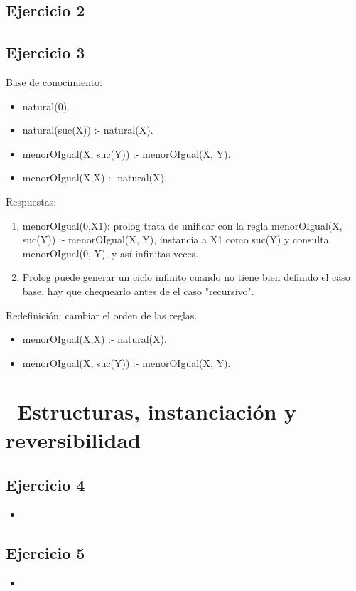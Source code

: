 \documentclass[10pt,a4paper]{article}
\begin{document}
\subsection{Ejercicio 2}


\subsection{Ejercicio 3}
    Base de conocimiento:
    \begin{itemize}
        \item natural(0).
        \item natural(suc(X)) :- natural(X).
        \item menorOIgual(X, suc(Y)) :- menorOIgual(X, Y).
        \item menorOIgual(X,X) :- natural(X).
    \end{itemize}
    
    Respuestas:
    \begin{enumerate}
        \item menorOIgual(0,X1): prolog trata de unificar con la regla menorOIgual(X, suc(Y)) :- menorOIgual(X, Y), instancia a X1 como suc(Y) y consulta menorOIgual(0, Y), y así infinitas veces.
        \item Prolog puede generar un ciclo infinito cuando no tiene bien definido el caso base, hay que chequearlo antes de el caso "recursivo".
    \end{enumerate}
    
    Redefinición: cambiar el orden de las reglas.
    \begin{itemize}
        \item menorOIgual(X,X) :- natural(X).
        \item menorOIgual(X, suc(Y)) :- menorOIgual(X, Y).
    \end{itemize}

\section*{\ Estructuras, instanciación y reversibilidad}

\subsection{Ejercicio 4}
\begin{itemize}
\item
\end{itemize}

\subsection{Ejercicio 5}
\begin{itemize}
\item
\end{itemize}
\end{document}
